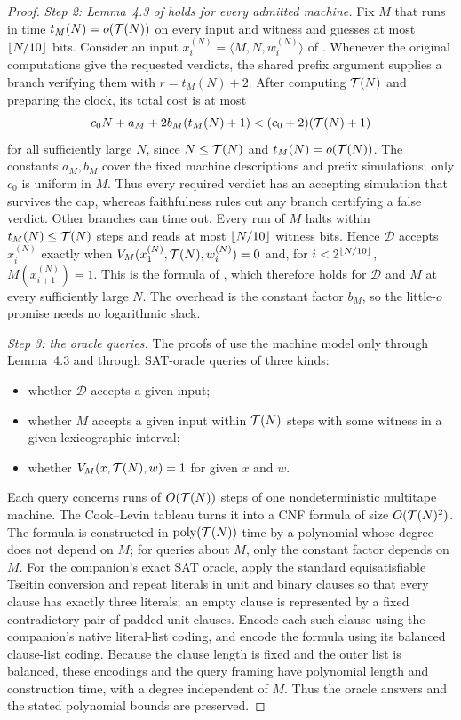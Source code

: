 \begin{proof}
\emph{Step 2: Lemma~4.3 of \cite{CLW20} holds for every admitted machine.}
Fix \(M\) that runs in time \(t_M(N)=o(\mathcal T(N))\) on every input and
witness and guesses at most \(\left\lfloor N/10\right\rfloor\) bits. Consider an input
\(x^{(N)}_i=\langle M,N,w^{(N)}_i\rangle\) of \cite[Section~4.2]{CLW20}.
Whenever the original computations give the requested verdicts, the
shared prefix argument supplies a branch verifying them with
\(r=t_M(N)+2\). After computing \(\mathcal T(N)\) and preparing the
clock, its total cost is at most
\[
 c_0N+a_M+2b_M(t_M(N)+1)
 <(c_0+2)(\mathcal T(N)+1)
\]
for all sufficiently large \(N\), since \(N\le\mathcal T(N)\) and
\(t_M(N)=o(\mathcal T(N))\). The constants \(a_M,b_M\) cover the fixed
machine descriptions and prefix simulations; only \(c_0\) is uniform
in \(M\). Thus every required verdict has an accepting simulation
that survives the cap, whereas faithfulness rules out any branch
certifying a false verdict. Other branches can time out. Every
run of \(M\) halts within \(t_M(N)\le\mathcal T(N)\) steps and reads at most
\(\left\lfloor N/10\right\rfloor\) witness bits. Hence \(\mathcal D\) accepts
\(x^{(N)}_i\) exactly when \(V_M(x^{(N)}_1,\mathcal T(N),w^{(N)}_i)=0\) and,
for \(i<2^{\left\lfloor N/10\right\rfloor}\), \(M(x^{(N)}_{i+1})=1\). This is the formula
of \cite[Lemma~4.3]{CLW20}, which therefore holds for \(\mathcal D\) and
\(M\) at every sufficiently large \(N\). The overhead is the constant
factor \(b_M\), so the little-\(o\) promise needs no logarithmic slack.

\emph{Step 3: the oracle queries.} The proofs of \cite[Theorems~1.12
and~4.6]{CLW20} use the machine model only through Lemma~4.3 and through
SAT-oracle queries of three kinds:
\begin{itemize}
\item whether \(\mathcal D\) accepts a given input;
\item whether \(M\) accepts a given input within \(\mathcal T(N)\) steps with
some witness in a given lexicographic interval;
\item whether \(V_M(x,\mathcal T(N),w)=1\) for given \(x\) and \(w\).
\end{itemize}
Each query concerns runs of \(O(\mathcal T(N))\) steps of one nondeterministic
multitape machine. The Cook--Levin tableau turns it into a CNF formula
of size \(O(\mathcal T(N)^2)\). The formula is constructed in
\(\operatorname{poly}(\mathcal T(N))\) time by a polynomial whose degree does not depend on
\(M\); for queries about \(M\), only the constant factor depends on
\(M\).
For the companion's exact SAT oracle, apply the standard equisatisfiable
Tseitin conversion and repeat literals in unit and binary clauses so
that every clause has exactly three literals; an empty clause is
represented by a fixed contradictory pair of padded unit clauses.
Encode each such clause using the companion's native literal-list
coding, and encode the formula using its balanced clause-list coding.
Because the clause length is fixed and the outer list is balanced,
these encodings and the query framing have polynomial length and
construction time, with a degree independent of \(M\). Thus the oracle
answers and the stated polynomial bounds are preserved.


\end{proof}
